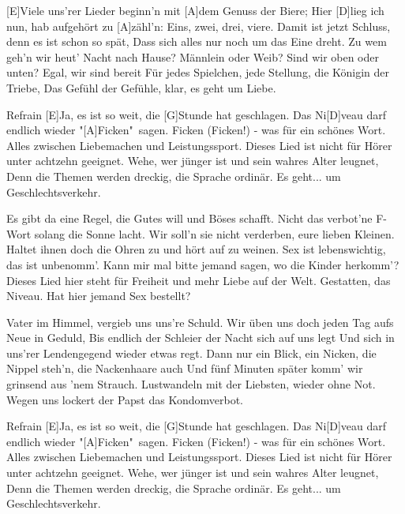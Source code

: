 

\begin{guitar}
	[E]Viele uns'rer Lieder beginn'n mit [A]dem Genuss der Biere;
	Hier [D]lieg ich nun, hab aufgehört zu [A]zähl'n: Eins, zwei, drei, viere.
	Damit ist jetzt Schluss, denn es ist schon so spät,
	Dass sich alles nur noch um das Eine dreht.
	Zu wem geh'n wir heut' Nacht nach Hause? Männlein oder Weib?
	Sind wir oben oder unten? Egal, wir sind bereit
	Für jedes Spielchen, jede Stellung, die Königin der Triebe,
	Das Gefühl der Gefühle, klar, es geht um Liebe.
	
  \begin{chorus}{Refrain}
	[E]Ja, es ist so weit, die [G]Stunde hat geschlagen.
	Das Ni[D]veau darf endlich wieder "[A]Ficken"\ sagen.
	Ficken (Ficken!) - was für ein schönes Wort.
	Alles zwischen Liebemachen und Leistungssport.
	Dieses Lied ist nicht für Hörer unter achtzehn geeignet.
	Wehe, wer jünger ist und sein wahres Alter leugnet,
	Denn die Themen werden dreckig, die Sprache ordinär.
	Es geht... um Geschlechtsverkehr.%
  \end{chorus}
	
	Es gibt da eine Regel, die Gutes will und Böses schafft.
	Nicht das verbot'ne F-Wort solang die Sonne lacht.
	Wir soll'n sie nicht verderben, eure lieben Kleinen.
	Haltet ihnen doch die Ohren zu und hört auf zu weinen.
	Sex ist lebenswichtig, das ist unbenomm'.
	Kann mir mal bitte jemand sagen, wo die Kinder herkomm'?
	Dieses Lied hier steht für Freiheit und mehr Liebe auf der Welt.
	Gestatten, das Niveau. Hat hier jemand Sex bestellt?
	
	 
	
	\pagebreak
	
	Vater im Himmel, vergieb uns uns're Schuld.
	Wir üben uns doch jeden Tag aufs Neue in Geduld,
	Bis endlich der Schleier der Nacht sich auf uns legt
	Und sich in uns'rer Lendengegend wieder etwas regt.
	Dann nur ein Blick, ein Nicken, die Nippel steh'n, die Nackenhaare auch
	Und fünf Minuten später komm' wir grinsend aus 'nem Strauch.
	Lustwandeln mit der Liebsten, wieder ohne Not.
	Wegen uns lockert der Papst das Kondomverbot.
	
  \begin{chorus}{Refrain}
	[E]Ja, es ist so weit, die [G]Stunde hat geschlagen.
	Das Ni[D]veau darf endlich wieder "[A]Ficken"\ sagen.
	Ficken (Ficken!) - was für ein schönes Wort.
	Alles zwischen Liebemachen und Leistungssport.
	Dieses Lied ist nicht für Hörer unter achtzehn geeignet.
	Wehe, wer jünger ist und sein wahres Alter leugnet,
	Denn die Themen werden dreckig, die Sprache ordinär.
	Es geht... um Geschlechtsverkehr.%
  \end{chorus}
	

\end{guitar}
